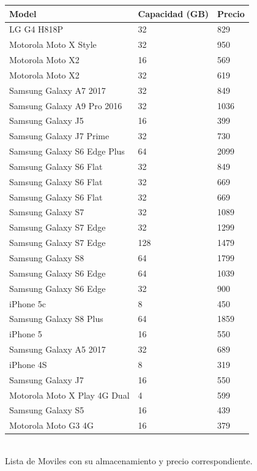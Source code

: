 \documentclass[a4paper ,12pt]{article}
\begin{document}
\begin{center}
		
		\begin{tabular}{lll}
			\hline
			Model&Capacidad (GB)&Precio \\
			\hline
	
	LG G4 H818P&32&829 \\ 
	Motorola Moto X Style&32&950 \\
	Motorola Moto X2&16&569 \\
	Motorola Moto X2&32&619 \\
	Samsung Galaxy A7 2017&32&849 \\
	Samsung Galaxy A9 Pro 2016&32&1036 \\
	Samsung Galaxy J5&16&399 \\
	Samsung Galaxy J7 Prime&32&730 \\
	Samsung Galaxy S6 Edge Plus&64&2099 \\
	Samsung Galaxy S6 Flat&32&849 \\
	Samsung Galaxy S6 Flat&32&669 \\
	Samsung Galaxy S6 Flat&32&669 \\
	Samsung Galaxy S7&32&1089 \\
	Samsung Galaxy S7 Edge&32&1299 \\
	Samsung Galaxy S7 Edge&128&1479 \\
	Samsung Galaxy S8&64&1799 \\
	Samsung Galaxy S6 Edge&64&1039 \\
	Samsung Galaxy S6 Edge&32&900 \\
	iPhone 5c&8&450 \\
	Samsung Galaxy S8 Plus&64&1859  \\
	iPhone 5&16&550 \\
	Samsung Galaxy A5 2017&32&689 \\
	iPhone 4S&8&319 \\
	Samsung Galaxy J7&16&550 \\
	Motorola Moto X Play 4G Dual&4&599 \\
	Samsung Galaxy S5&16&439 \\
	Motorola Moto G3 4G&16&379 \\

		\hline
	\end{tabular}
	\\
	
	Lista de Moviles con su almacenamiento y precio correspondiente.

\end{center}
\end{document}
